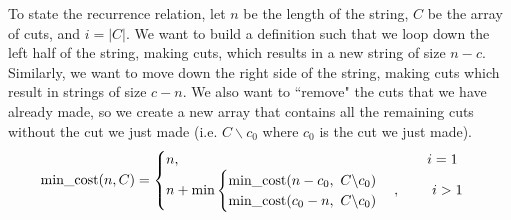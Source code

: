 \documentclass{hw}
\begin{document}
To state the recurrence relation, let $n$ be the length of the string, $C$ be the array of cuts,
and $i=|C|$. We want to build a definition such that we loop down the left half of the string, making
cuts, which results in a new string of size $n-c$. Similarly, we want to move down the right side of
the string, making cuts which result in strings of size $c-n$. We also want to ``remove" the cuts that
we have already made, so we create a new array that contains all the remaining cuts without the cut we
just made (i.e. $C\backslash c_{0}$ where $c_{0}$ is the cut we just made).
\[
\text{min\_cost}(n, C)=
\begin{cases}
n,\hspace{6.2cm} i = 1\\
n + \text{min}
\begin{cases}
\text{min\_cost}(n - c_{0},\ C\backslash c_{0})\\
\text{min\_cost}(c_{0} - n,\ C\backslash c_{0})
\end{cases},
\hspace{0.8cm} i > 1
\end{cases}
\]
\end{document}
